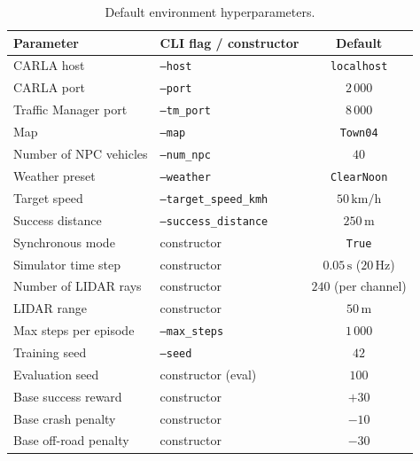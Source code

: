 \begin{table}[H]
  \centering
  \caption{Default environment hyperparameters.}
  \label{tab:hp-env}
  \small
  \begin{tabular}{@{}llc@{}}
    \toprule
    \textbf{Parameter} & \textbf{CLI flag / constructor} & \textbf{Default} \\
    \midrule
    CARLA host                & \texttt{--host}             & \texttt{localhost} \\
    CARLA port                & \texttt{--port}             & \(2\,000\) \\
    Traffic Manager port      & \texttt{--tm\_port}         & \(8\,000\) \\
    Map                       & \texttt{--map}              & \texttt{Town04} \\
    Number of NPC vehicles    & \texttt{--num\_npc}         & \(40\) \\
    Weather preset            & \texttt{--weather}          & \texttt{ClearNoon} \\
    Target speed              & \texttt{--target\_speed\_kmh} & \(50\,\mathrm{km/h}\) \\
    Success distance          & \texttt{--success\_distance}  & \(250\,\mathrm{m}\) \\
    Synchronous mode          & constructor                 & \texttt{True} \\
    Simulator time step       & constructor                 & \(0.05\,\mathrm{s}\) (\(20\,\mathrm{Hz}\)) \\
    Number of LIDAR rays      & constructor                 & \(240\) (per channel) \\
    LIDAR range               & constructor                 & \(50\,\mathrm{m}\) \\
    Max steps per episode     & \texttt{--max\_steps}       & \(1\,000\) \\
    Training seed             & \texttt{--seed}             & \(42\) \\
    Evaluation seed           & constructor (eval)          & \(100\) \\
    Base success reward       & constructor                 & \(+30\) \\
    Base crash penalty        & constructor                 & \(-10\) \\
    Base off-road penalty     & constructor                 & \(-30\) \\
    \bottomrule
  \end{tabular}
\end{table}

